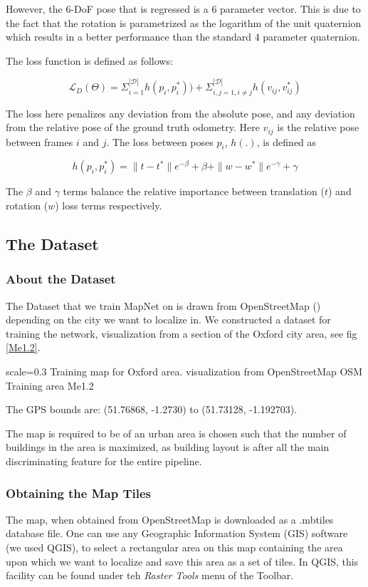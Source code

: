 However, the 6-DoF pose that is regressed is a 6 parameter vector. This is due to the fact that the rotation is parametrized as the logarithm of the unit quaternion which results in a better performance than the standard 4 parameter quaternion. 

The loss function is defined as follows:

\[ \mathcal{L}_D(\Theta)= \Sigma_{i=1}^{|\mathcal{D}|}h(p_i,p_i^{*})) + \Sigma_{i,j=1, i\neq j}^{|\mathcal{D}|}h(v_{ij},v_{ij}^{*}) \] 

The loss here penalizes any deviation from the absolute pose, and any deviation from the relative pose of the ground truth odometry. Here $v_{ij}$ is the relative pose between frames $i$ and $j$. The loss between poses $p_i$, $h(.)$, is defined as

\[ h(p_i,p_i^{*}) = \|t - t^*\|e^{-\beta} + \beta + \|w - w^*\|e^{-\gamma} + \gamma \]

The $\beta$ and $\gamma$ terms balance the relative importance between translation ($t$) and rotation ($w$) loss terms respectively. 

\subsection{The Dataset}

\subsubsection{About the Dataset}
The Dataset that we train MapNet on is drawn from OpenStreetMap (\cite{osm2017}) depending on the city we want to localize in. We constructed a dataset for training the network, visualization from a section of the Oxford city area, see fig \ref{Me1.2}.

{scale=0.3}%
{Training map for Oxford area. visualization from OpenStreetMap}%
{OSM Training area}%
{Me1.2}

The GPS bounds are: (51.76868, -1.2730) to (51.73128, -1.192703).

The map is required to be of an urban area is chosen such that the number of buildings in the area is maximized, as building layout is after all the main discriminating feature for the entire pipeline. 

\subsubsection{Obtaining the Map Tiles}
The map, when obtained from OpenStreetMap is downloaded as a .mbtiles database file. One can use any Geographic Information System (GIS) software (we used QGIS), to select a rectangular area on this map containing the area upon which we want to localize and save this area as a set of tiles. In QGIS, this facility can be found under teh \emph{Raster Tools} menu of the Toolbar.

